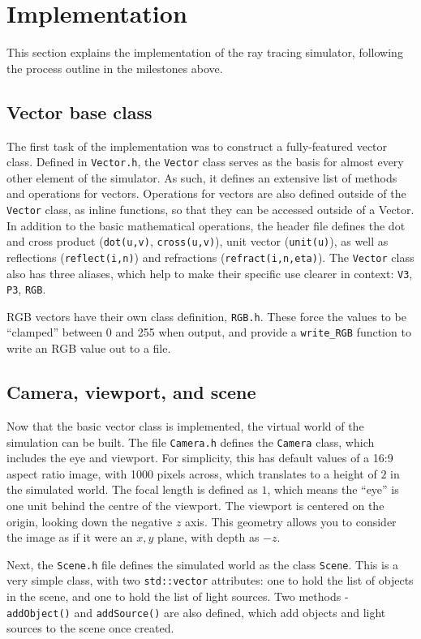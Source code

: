 \documentclass[a4paper]{article}
\begin{document}
\section{Implementation}
This section explains the implementation of the ray tracing simulator, following the process outline in the milestones above.

\subsection{Vector base class}
The first task of the implementation was to construct a fully-featured vector class. Defined in \verb|Vector.h|, the \verb|Vector| class serves as the basis for almost every other element of the simulator. As such, it defines an extensive list of methods and operations for vectors. Operations for vectors are also defined outside of the \verb|Vector| class, as inline functions, so that they can be accessed outside of a Vector. In addition to the basic mathematical operations, the header file defines the dot and cross product (\verb|dot(u,v)|, \verb|cross(u,v)|), unit vector (\verb|unit(u)|), as well as reflections (\verb|reflect(i,n)|) and refractions (\verb|refract(i,n,eta)|). The \verb|Vector| class also has three aliases, which help to make their specific use clearer in context: \verb|V3|, \verb|P3|, \verb|RGB|.

RGB vectors have their own class definition, \verb|RGB.h|. These force the values to be ``clamped'' between 0 and 255 when output, and provide a \verb|write_RGB| function to write an RGB value out to a file.

\subsection{Camera, viewport, and scene}
Now that the basic vector class is implemented, the virtual world of the simulation can be built. The file \verb|Camera.h| defines the \verb|Camera| class, which includes the eye and viewport. For simplicity, this has default values of a 16:9 aspect ratio image, with 1000 pixels across, which translates to a height of $2$ in the simulated world. The focal length is defined as $1$, which means the ``eye'' is one unit behind the centre of the viewport. The viewport is centered on the origin, looking down the negative $z$ axis. This geometry allows you to consider the image as if it were an $x,y$ plane, with depth as $-z$. 

Next, the \verb|Scene.h| file defines the simulated world as the class \verb|Scene|. This is a very simple class, with two \verb|std::vector| attributes: one to hold the list of objects in the scene, and one to hold the list of light sources. Two methods - \verb|addObject()| and \verb|addSource()| are also defined, which add objects and light sources to the scene once created.
\end{document}
